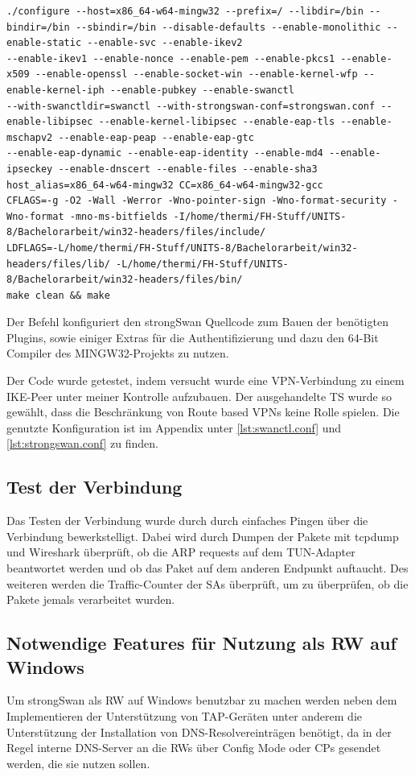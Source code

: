 {\begin{lstlisting}[caption=./configure und make]
./configure --host=x86_64-w64-mingw32 --prefix=/ --libdir=/bin --bindir=/bin --sbindir=/bin --disable-defaults --enable-monolithic --enable-static --enable-svc --enable-ikev2 
--enable-ikev1 --enable-nonce --enable-pem --enable-pkcs1 --enable-x509 --enable-openssl --enable-socket-win --enable-kernel-wfp --enable-kernel-iph --enable-pubkey --enable-swanctl 
--with-swanctldir=swanctl --with-strongswan-conf=strongswan.conf --enable-libipsec --enable-kernel-libipsec --enable-eap-tls --enable-mschapv2 --enable-eap-peap --enable-eap-gtc 
--enable-eap-dynamic --enable-eap-identity --enable-md4 --enable-ipseckey --enable-dnscert --enable-files --enable-sha3 host_alias=x86_64-w64-mingw32 CC=x86_64-w64-mingw32-gcc 
CFLAGS=-g -O2 -Wall -Werror -Wno-pointer-sign -Wno-format-security -Wno-format -mno-ms-bitfields -I/home/thermi/FH-Stuff/UNITS-8/Bachelorarbeit/win32-headers/files/include/ 
LDFLAGS=-L/home/thermi/FH-Stuff/UNITS-8/Bachelorarbeit/win32-headers/files/lib/ -L/home/thermi/FH-Stuff/UNITS-8/Bachelorarbeit/win32-headers/files/bin/
make clean && make
\end{lstlisting}


Der Befehl konfiguriert den strongSwan Quellcode zum Bauen der benötigten Plugins, sowie einiger
Extras für die Authentifizierung und dazu den 64-Bit Compiler des MINGW32-Projekts zu nutzen.

Der Code wurde getestet, indem versucht wurde eine VPN-Verbindung zu einem \ac{IKE}-Peer
unter meiner Kontrolle aufzubauen. Der ausgehandelte \ac{TS} wurde so gewählt, dass
die Beschränkung von Route based VPNs keine Rolle spielen.
Die genutzte Konfiguration ist im Appendix unter \autoref{lst:swanctl.conf}
und \autoref{lst:strongswan.conf} zu finden.

\subsection{Test der Verbindung}
Das Testen der Verbindung wurde durch durch einfaches Pingen über die Verbindung bewerkstelligt.
Dabei wird durch Dumpen der Pakete mit tcpdump und Wireshark überprüft, ob die
ARP requests auf dem TUN-Adapter beantwortet werden und ob das Paket auf dem
anderen Endpunkt auftaucht. Des weiteren werden die Traffic-Counter der \acp{SA} überprüft,
um zu überprüfen, ob die Pakete jemals verarbeitet wurden.

\subsection{Notwendige Features für Nutzung als RW auf Windows}
Um strongSwan als \ac{RW} auf Windows benutzbar zu machen werden neben dem Implementieren
der Unterstützung von TAP-Geräten unter anderem die Unterstützung der Installation von DNS-Resolvereinträgen
benötigt, da in der Regel interne DNS-Server an die \acp{RW} über Config Mode oder \acp{CP}
gesendet werden, die sie nutzen sollen.

}
